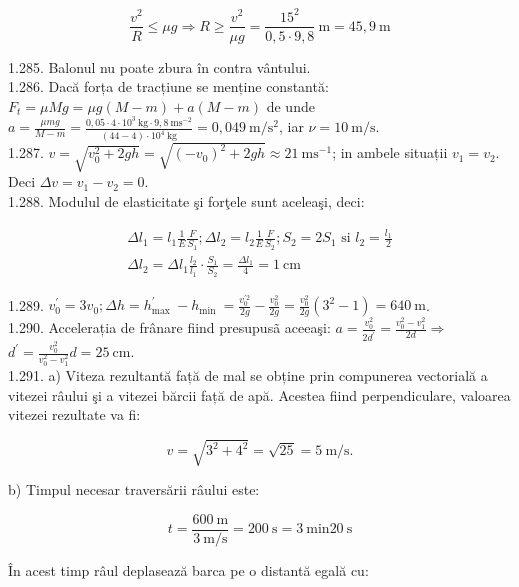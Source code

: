$$
\frac{v^{2}}{R} \leq \mu g \Rightarrow R \geq \frac{v^{2}}{\mu g}=\frac{15^{2}}{0,5 \cdot 9,8} \mathrm{~m}=45,9 \mathrm{~m}
$$

1.285. Balonul nu poate zbura în contra vântului.\\
1.286. Dacă forța de tracțiune se menține constantă:\\
$F_{t}=\mu M g=\mu g(M-m)+a(M-m)$ de unde\\
$a=\frac{\mu m g}{M-m}=\frac{0,05 \cdot 4 \cdot 10^{3} \mathrm{~kg} \cdot 9,8 \mathrm{~ms}^{-2}}{(44-4) \cdot 10^{4} \mathrm{~kg}}=0,049 \mathrm{~m} / \mathrm{s}^{2}$, iar $\nu=10 \mathrm{~m} / \mathrm{s}$.\\
1.287. $v=\sqrt{v_{0}^{2}+2 g h}=\sqrt{\left(-v_{0}\right)^{2}+2 g h} \approx 21 \mathrm{~ms}^{-1}$; in ambele situații $v_{1}=v_{2}$. Deci $\Delta v=v_{1}-v_{2}=0$.\\
1.288. Modulul de elasticitate şi forţele sunt aceleaşi, deci:

$$
\begin{gathered}
\Delta l_{1}=l_{1} \frac{1}{E} \frac{F}{S_{1}} ; \Delta l_{2}=l_{2} \frac{1}{E} \frac{F}{S_{2}} ; S_{2}=2 S_{1} \text { si } l_{2}=\frac{l_{1}}{2} \\
\Delta l_{2}=\Delta l_{1} \frac{l_{2}}{l_{1}} \cdot \frac{S_{1}}{S_{2}}=\frac{\Delta l_{1}}{4}=1 \mathrm{~cm}
\end{gathered}
$$

1.289. $v_{0}^{\prime}=3 v_{0} ; \Delta h=h_{\text {max }}^{\prime}-h_{\text {min }}=\frac{v_{0}^{\prime 2}}{2 g}-\frac{v_{0}^{2}}{2 g}=\frac{v_{0}^{2}}{2 g}\left(3^{2}-1\right)=640 \mathrm{~m}$.\\
1.290. Accelerația de frânare fiind presupusã aceeaşi: $a=\frac{v_{0}^{2}}{2 d^{\prime}}=\frac{v_{0}^{2}-v_{1}^{2}}{2 d} \Rightarrow$ $d^{\prime}=\frac{v_{0}^{2}}{v_{0}^{2}-v_{1}^{2}} d=25 \mathrm{~cm}$.\\
1.291. a) Viteza rezultantă față de mal se obține prin compunerea vectorială a vitezei râului şi a vitezei bărcii față de apă. Acestea fiind perpendiculare, valoarea vitezei rezultate va fi:

$$
v=\sqrt{3^{2}+4^{2}}=\sqrt{25}=5 \mathrm{~m} / \mathrm{s} .
$$

b) Timpul necesar traversării râului este:

$$
t=\frac{600 \mathrm{~m}}{3 \mathrm{~m} / \mathrm{s}}=200 \mathrm{~s}=3 \mathrm{~min} 20 \mathrm{~s}
$$

În acest timp râul deplasează barca pe o distantă egală cu:

